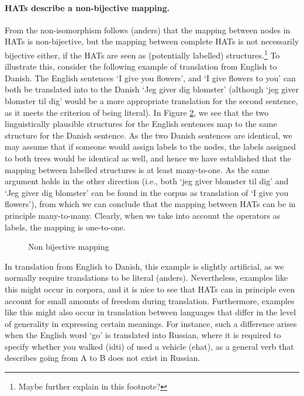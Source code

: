 \documentclass{report}
\newcommand\textcyr[1]{{\fontencoding{OT2}\fontfamily{wncyr}\selectfont #1}}
\theoremstyle{definition}
\theoremstyle{plain}
\begin{document}
\begin{figure}
\caption{}\label{fig:nepas}
\end{figure}

\paragraph{HATs describe a non-bijective mapping.} From the non-isomorphism follows (anders) that the mapping between nodes in HATs is non-bijective, but the mapping between complete HATs is not necessarily bijective either, if the HATs are seen as (potentially labelled) structures.\footnote{Maybe further explain in this footnote?} To illustrate this, consider the following example of translation from English to Danish. The English sentences `I give you flowers', and `I give flowers to you' can both be translated into to the Danish `Jeg giver dig blomster' (although `jeg giver blomster til dig' would be a more appropriate translation for the second sentence, as it meets the criterion of being literal). In Figure \ref{fig:nonbij}, we see that the two linguistically plausible structures for the English sentences map to the same structure for the Danish sentence. As the two Danish sentences are identical, we may assume that if someone would assign labels to the nodes, the labels assigned to both trees would be identical as well, and hence we have established that the mapping between labelled structures is at least many-to-one. As the same argument holds in the other direction (i.e., both `jeg giver blomster til dig' and `Jeg giver dig blomster' can be found in the corpus as translation of `I give you flowers'), from which we can conclude that the mapping between HATs can be in principle many-to-many. Clearly, when we take into account the operators as labels, the mapping is one-to-one. 

\begin{figure}
\caption{Non bijective mapping}\label{fig:nonbij}
\end{figure}

In translation from English to Danish, this example is slightly artificial, as we normally require translations to be literal (anders). Nevertheless, examples like this might occur in corpora, and it is nice to see that HATs can in principle even account for small amounts of freedom during translation. Furthermore, examples like this might also occur in translation between languages that differ in the level of generality in expressing certain meanings. For instance, such a difference arises when the English word `go' is translated into Russian, where it is required to specify whether you walked (\textcyr{idti}) of used a vehicle (\textcyr{ehat}), as a general verb that describes going from A to B does not exist in Russian.
\end{document}
